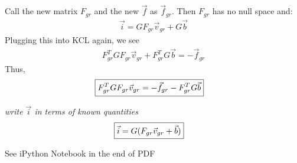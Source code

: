 \documentclass[letter]{article}
\newenvironment{menumerate}{%
  \edef\backupindent{\the\parindent}%
  \enumerate%
  \setlength{\parindent}{\backupindent}%
}{\endenumerate}
\begin{document}
\begin{menumerate}
\begin{menumerate}
        Call the new matrix $F_{gr}$ and the new $\vec{f}$ as $\vec{f}_{gr}$. Then $F_{gr}$ has no null space and:
        \begin{align}
            \vec{i} = GF_{gr}\vec{v}_{gr} + G\vec{b}
        \end{align}
        Plugging this into KCL again, we see
        \begin{align}
            F^T_{gr}GF_{gr}\vec{v}_{gr} + F^T_{gr}G\vec{b} = -\vec{f}_{gr}
        \end{align}
        Thus,
        \begin{align}
            \Aboxed{F^T_{gr}GF_{gr}\vec{v}_{gr} = -\vec{f}_{gr} - F^T_{gr}G\vec{b}}
        \end{align}
        \item \emph{write $\vec{i}$ in terms of known quantities}
        \begin{align}
            \Aboxed{\vec{i} = G(F_{gr}\vec{v}_{gr} + \vec{b})}
        \end{align}
        \item See iPython Notebook in the end of PDF
    \end{menumerate}

\end{menumerate}
\end{document}
